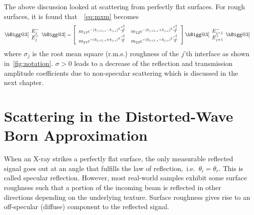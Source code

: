 \documentclass[10pt,twoside, b5paper,pdftex]{report}
\makeatletter
\newcommand{\vast}{\bBigg@{3}}
\makeatother
\begin{document}
The above discussion looked at scattering from perfectly flat surfaces. For rough surfaces, it is found that~\cite{VIDAL}~\cref{eq:mxm} becomes 
%
\begin{equation}\label{eq:mxm_r}
\vast[ \begin{array}{c} E^{-}_{j} \\ E^{+}_{j}   \end{array} \vast]  = \left[ \begin{array}{cc} m_{11}e^{-\left(k_{j+1,z}-k_{j,z}\right)^{2}\frac{\sigma_{j}^{2}}{2}} & m_{12}e^{-\left(k_{j+1,z}+k_{j,z}\right)^{2}\frac{\sigma_{j}^{2}}{2}} \\ m_{21}e^{-\left(k_{j+1,z}+k_{j,z}\right)^{2}\frac{\sigma_{j}^{2}}{2}} & m_{22}e^{-\left(k_{j+1,z}-k_{j,z}\right)^{2}\frac{\sigma_{j}^{2}}{2}} \end{array} \right] \vast[ \begin{array}{c} E^{-}_{j+1} \\ E^{+}_{j+1} \end{array} \vast] 
\end{equation}   
%
where $\sigma_{j}$ is the root mean square (r.m.s.) roughness of the $j$'th interface as shown in~\cref{fig:notation}. $\sigma > 0$ leads to a decrease of the reflection and transmission amplitude coefficients due to non-specular scattering which is discussed in the next chapter. 



\chapter{Scattering in the Distorted-Wave Born Approximation\label{chap:dwba}}
When an X-ray strikes a perfectly flat surface, the only measurable reflected signal goes out at an angle that fulfills the law of reflection,~i.e.~$\theta_{i}=\theta_{r}$. This is called specular reflection. However, most real-world samples exhibit some surface roughness such that a portion of the incoming beam is reflected in other directions depending on the underlying texture. Surface roughness gives rise to an off-specular (diffuse) component to the reflected signal.  
\end{document}

